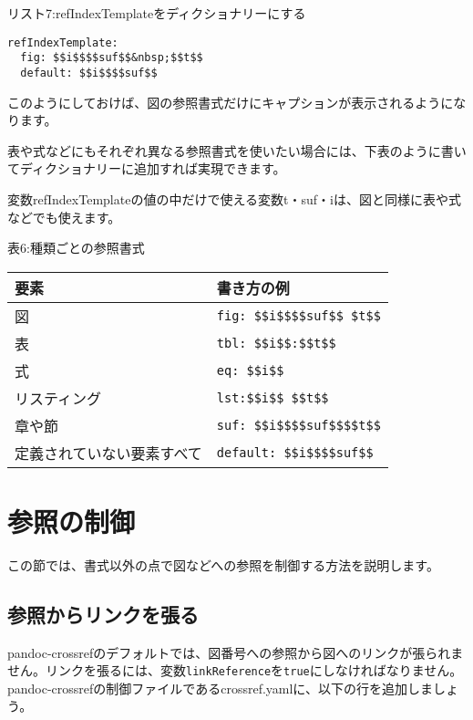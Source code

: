 リスト7:refIndexTemplateをディクショナリーにする

\begin{verbatim}
refIndexTemplate:
  fig: $$i$$$$suf$$&nbsp;$$t$$
  default: $$i$$$$suf$$
\end{verbatim}

このようにしておけば、図の参照書式だけにキャプションが表示されるようになります。

表や式などにもそれぞれ異なる参照書式を使いたい場合には、下表のように書いてディクショナリーに追加すれば実現できます。

変数refIndexTemplateの値の中だけで使える変数t・suf・iは、図と同様に表や式などでも使えます。

表6:種類ごとの参照書式

\begin{longtable}[]{@{}ll@{}}
\toprule\noalign{}
要素 & 書き方の例 \\
\midrule\noalign{}
\endhead
\bottomrule\noalign{}
\endlastfoot
図 & \texttt{fig:\ \$\$i\$\$\$\$suf\$\$\ \$t\$\$} \\
表 & \texttt{tbl:\ \$\$i\$\$:\$\$t\$\$} \\
式 & \texttt{eq:\ \$\$i\$\$} \\
リスティング & \texttt{lst:\$\$i\$\$\ \$\$t\$\$} \\
章や節 & \texttt{suf:\ \$\$i\$\$\$\$suf\$\$\$\$t\$\$} \\
定義されていない要素すべて & \texttt{default:\ \$\$i\$\$\$\$suf\$\$} \\
\end{longtable}

\section{参照の制御}\label{ux53c2ux7167ux306eux5236ux5fa1}

この節では、書式以外の点で図などへの参照を制御する方法を説明します。

\subsection{参照からリンクを張る}\label{ux53c2ux7167ux304bux3089ux30eaux30f3ux30afux3092ux5f35ux308b}

pandoc-crossrefのデフォルトでは、図番号への参照から図へのリンクが張られません。リンクを張るには、変数\texttt{linkReference}を\texttt{true}にしなければなりません。pandoc-crossrefの制御ファイルであるcrossref.yamlに、以下の行を追加しましょう。

